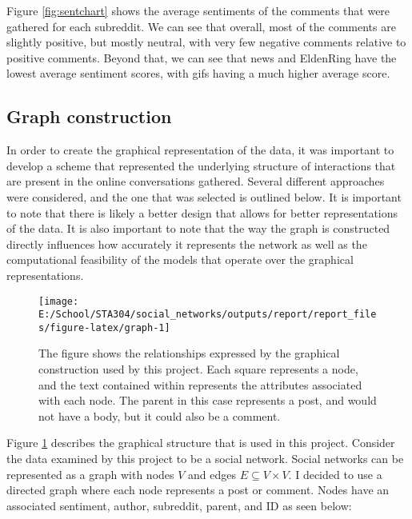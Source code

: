 \documentclass[
]{article}
\begin{document}
Figure \ref{fig:sentchart} shows the average sentiments of the comments that were gathered for each subreddit. We can see that overall, most of the comments are slightly positive, but mostly neutral, with very few negative comments relative to positive comments. Beyond that, we can see that news and EldenRing have the lowest average sentiment scores, with gifs having a much higher average score.

\hypertarget{graph-construction}{%
\subsection{Graph construction}\label{graph-construction}}

In order to create the graphical representation of the data, it was important to develop a scheme that represented the underlying structure of interactions that are present in the online conversations gathered. Several different approaches were considered, and the one that was selected is outlined below. It is important to note that there is likely a better design that allows for better representations of the data. It is also important to note that the way the graph is constructed directly influences how accurately it represents the network as well as the computational feasibility of the models that operate over the graphical representations.

\begin{figure}

{\centering \texttt{[image: E:/School/STA304/social\_networks/outputs/report/report\_files/figure-latex/graph-1]} 

}

\caption{The figure shows the relationships expressed by the graphical construction used by this project. Each square represents a node, and the text contained within represents the attributes associated with each node. The parent in this case represents a post, and would not have a body, but it could also be a comment.}\label{fig:graph}
\end{figure}

Figure \ref{fig:graph} describes the graphical structure that is used in this project. Consider the data examined by this project to be a social network. Social networks can be represented as a graph with nodes \(V\) and edges \(E\subseteq V\times V\). I decided to use a directed graph where each node represents a post or comment. Nodes have an associated sentiment, author, subreddit, parent, and ID as seen below:
\end{document}
